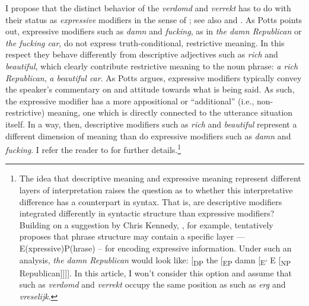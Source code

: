 \documentclass[output=paper]{langsci/langscibook}
\begin{document}
I propose that the distinct behavior of the  \emph{verdomd}
and \emph{verrekt} has to do with their status as \emph{expressive} modifiers
in the sense of \textcite{Potts2005}; see also \textcite{Potts2007} and
\citet{Morzycki2008}. As Potts points out,  expressive modifiers such as
\emph{damn} and \emph{fucking}, as in \emph{the damn Republican} or \emph{the
fucking car}, do not express truth-conditional, restrictive meaning. In this
respect they behave differently from descriptive adjectives such as \emph{rich}
and \emph{beautiful}, which clearly contribute restrictive meaning to the noun
phrase: \emph{a rich Republican}, \emph{a beautiful car}. As Potts argues,
expressive modifiers typically convey the speaker's commentary on and attitude
towards what is being said. As such, the expressive modifier has a more
appositional or \enquote{additional} (i.e., non-restrictive) meaning, one which
is directly connected to the utterance situation itself. In a way, then,
descriptive modifiers such as \emph{rich} and \emph{beautiful} represent a
different dimension of meaning than do expressive modifiers such as \emph{damn}
and \emph{fucking}. I refer the reader to \textcite{Potts2005,Potts2007} for
further details.\footnote{The idea that descriptive meaning and expressive
    meaning represent different layers of interpretation raises the question as
    to whether this interpretative difference has a counterpart in syntax. That
    is, are descriptive modifiers integrated differently in syntactic structure
    than expressive modifiers? Building on a suggestion by Chris Kennedy,
    \citet{Morzycki2008}, for example, tentatively proposes that phrase
    structure may contain a specific layer — E(xpressive)P(hrase) – for
    encoding expressive information. Under such an analysis, \emph{the damn
    Republican} would look like: [\textsubscript{DP} the [\textsubscript{EP}
    damn [\textsubscript{E$'$} E [\textsubscript{NP} Republican]]]]. In this
    article, I won't consider this option and assume that 
such as \emph{verdomd} and \emph{verrekt} occupy the same position as
 such as \emph{erg} and \emph{vreselijk}.}
\end{document}
